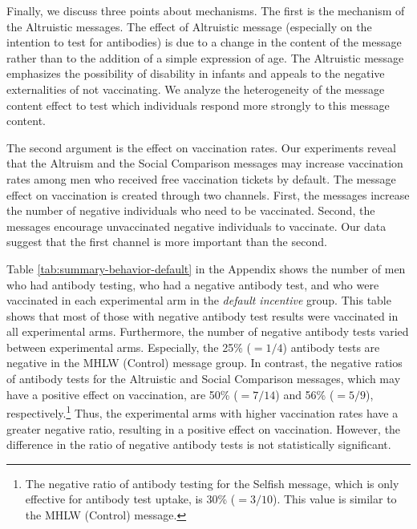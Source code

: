 \documentclass[
]{article}
\begin{document}
Finally, we discuss three points about mechanisms. The first is the mechanism of the Altruistic messages. The effect of Altruistic message (especially on the intention to test for antibodies) is due to a change in the content of the message rather than to the addition of a simple expression of age. The Altruistic message emphasizes the possibility of disability in infants and appeals to the negative externalities of not vaccinating. We analyze the heterogeneity of the message content effect to test which individuals respond more strongly to this message content.

The second argument is the effect on vaccination rates. Our experiments reveal that the Altruism and the Social Comparison messages may increase vaccination rates among men who received free vaccination tickets by default. The message effect on vaccination is created through two channels. First, the messages increase the number of negative individuals who need to be vaccinated. Second, the messages encourage unvaccinated negative individuals to vaccinate. Our data suggest that the first channel is more important than the second.

Table \ref{tab:summary-behavior-default} in the Appendix shows the number of men who had antibody testing, who had a negative antibody test, and who were vaccinated in each experimental arm in the \emph{default incentive} group. This table shows that most of those with negative antibody test results were vaccinated in all experimental arms. Furthermore, the number of negative antibody tests varied between experimental arms. Especially, the 25\% (\(=1/4\)) antibody tests are negative in the MHLW (Control) message group. In contrast, the negative ratios of antibody tests for the Altruistic and Social Comparison messages, which may have a positive effect on vaccination, are 50\% (\(=7/14\)) and 56\% (\(=5/9\)), respectively.\footnote{The negative ratio of antibody testing for the Selfish message, which is only effective for antibody test uptake, is 30\% (\(=3/10\)). This value is similar to the MHLW (Control) message.} Thus, the experimental arms with higher vaccination rates have a greater negative ratio, resulting in a positive effect on vaccination. However, the difference in the ratio of negative antibody tests is not statistically significant.
\end{document}
